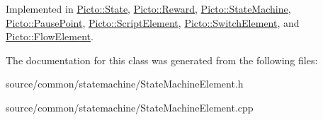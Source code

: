 Implemented in \hyperlink{class_picto_1_1_state_a853ee2b157c1c7ae8fee0898891d430c}{Picto\-::\-State}, \hyperlink{class_picto_1_1_reward_a22c9f49f9f942011a175798753c9995f}{Picto\-::\-Reward}, \hyperlink{class_picto_1_1_state_machine_a6af8e4f88e7ea89a85e415e5c2a117fb}{Picto\-::\-State\-Machine}, \hyperlink{class_picto_1_1_pause_point_ac062ab9f8b338924ee0312793ed5fc4f}{Picto\-::\-Pause\-Point}, \hyperlink{class_picto_1_1_script_element_a6044e7e03b1690093bd84f40e3b7eb0a}{Picto\-::\-Script\-Element}, \hyperlink{class_picto_1_1_switch_element_a7e1271d534baafee851628f3f366211e}{Picto\-::\-Switch\-Element}, and \hyperlink{class_picto_1_1_flow_element_a305d68e8cefb00cbb1f0d7f1c9026fc4}{Picto\-::\-Flow\-Element}.



The documentation for this class was generated from the following files\-:\begin{DoxyCompactItemize}
\item 
source/common/statemachine/State\-Machine\-Element.\-h\item 
source/common/statemachine/State\-Machine\-Element.\-cpp\end{DoxyCompactItemize}
